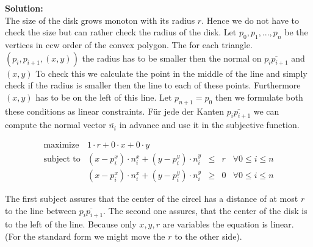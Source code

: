 \documentclass[11pt,a4paper,ngerman]{article}
\begin{document}
\textbf{Solution:}\\

The size of the disk grows monoton with its radius $r$. Hence we do not have
to check the size but can rather check the radius of the disk.
Let $p_0, p_1, ..., p_n$ be the vertices in ccw order of the convex polygon.
The for each triangle. $(p_i, p_{i+1}, (x,y))$ the radius has to be smaller
then the normal on $\overline{p_ip_{i+1}}$ and $(x,y)$ To check this
we calculate the point in the middle of the line and simply check
if the radius is smaller then the line to each of these points. Furthermore
$(x,y)$ has to be on the left of this line. Let $p_{n+1}=p_0$ then we
formulate both these conditions as linear constraints.
Für jede der Kanten $\overline{p_ip_{i+1}}$ we can compute the
normal vector $\overline{n_i}$ in advance and use it in the subjective function.

\begin{equation}\label{alge:ueb6:disklp}\begin{array}{lrclr}
    \text{maximize} & 1 \cdot r + 0 \cdot x + 0 \cdot y\\
    \text{subject to} & (x-p_i^x) \cdot n_i^x + (y-p_i^y) \cdot n_i^y & \leq & r & \forall 0 \leq i \leq n\\
                & (x - p_i^x) \cdot n_i^x + (y-p_i^y) \cdot n_i^y & \geq & 0 & \forall 0 \leq i \leq n
\end{array}\end{equation}

The first subject assures that the center of the circel has a distance of at most $r$ to the line between $\overline{p_ip_{i+1}}$.
The second one assures, that the center of the disk is to the left of the line.
Because only $x,y,r$ are variables the equation is linear.
(For the standard form we might move the $r$ to the other side).

\label{LastPage}
\end{document}
